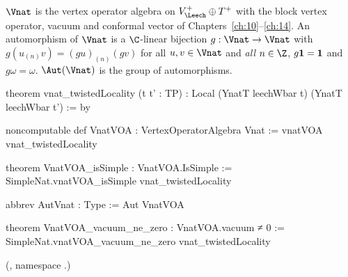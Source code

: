 \begin{definition}\label{ch20:def:vnat}
$\Vnat$ is the vertex operator algebra on $\chtwentyVL\oplus\chtwentyTp$ with the block vertex operator, vacuum and
conformal vector of Chapters~\ref{ch:10}--\ref{ch:14}.  An automorphism of $\Vnat$ is a $\C$-linear bijection
$g:\Vnat\to\Vnat$ with $g(u_{(n)}v)=(gu)_{(n)}(gv)$ for all $u,v\in\Vnat$ and \emph{all} $n\in\Z$,
$g\mathbf 1=\mathbf 1$ and $g\omega=\omega$.  $\Aut(\Vnat)$ is the group of automorphisms.
\end{definition}
\begin{leancode}
theorem vnat_twistedLocality (t t' : TP) : Local (YnatT leechWbar t) (YnatT leechWbar t') := by

noncomputable def VnatVOA : VertexOperatorAlgebra Vnat := vnatVOA vnat_twistedLocality

theorem VnatVOA_isSimple : VnatVOA.IsSimple :=
  SimpleNat.vnatVOA_isSimple vnat_twistedLocality

abbrev AutVnat : Type := Aut VnatVOA

theorem VnatVOA_vacuum_ne_zero : VnatVOA.vacuum ≠ 0 :=
  SimpleNat.vnatVOA_vacuum_ne_zero vnat_twistedLocality
\end{leancode}
(, namespace .)


